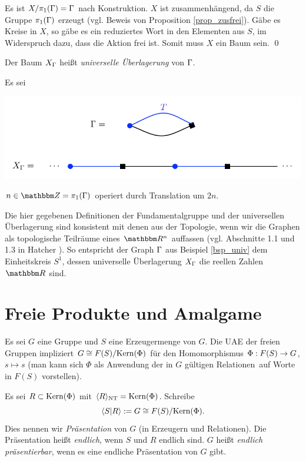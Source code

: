 \documentclass[a4paper, 12pt, twoside]{article}
\begin{document}
Es ist $X/\pi_1(\Gamma)=\Gamma$ nach Konstruktion. $X$ ist
zusammenhängend, da $S$ die Gruppe $\pi_1(\Gamma)$ erzeugt
(vgl. Beweis von Proposition \ref{prop_zusfrei}).
Gäbe es Kreise in $X$, so gäbe es ein reduziertes Wort in den
Elementen aus $S$, im Widerspruch dazu, dass die Aktion frei ist.
Somit muss $X$ ein Baum sein.
\qed

\DEF Der Baum $X_{\Gamma}$ heißt \emph{universelle Überlagerung} von $\Gamma$.

\BSP\label{bsp_univ} Es sei
\begin{center}
	\includegraphics{grugraImages/univ}
\end{center}
$n\in\ZZ=\pi_1(\GR)$ operiert durch Translation um $2n$.

Die hier gegebenen Definitionen der Fundamentalgruppe und der
universellen Überlagerung sind konsistent mit denen aus der
Topologie, wenn wir die Graphen als topologische Teilräume
eines $\RR^n$ auffassen
(vgl. Abschnitte 1.1 und 1.3 in Hatcher \cite{hatcher}).
So entspricht der Graph $\Gamma$ aus
Beispiel \ref{bsp_univ} dem Einheitskreis $S^1$, dessen
universelle Überlagerung $X_{\Gamma}$ die reellen Zahlen $\RR$ sind.


\section{Freie Produkte und Amalgame}\label{sec_amal}

Es sei $G$ eine Gruppe und $S$ eine Erzeugermenge von $G$.
Die UAE der freien Gruppen impliziert
$G\cong F(S)/\mathrm{Kern}(\Phi)$ für den Homomorphismus
$\Phi:F(S)\rightarrow G$, $s\mapsto s$ (man kann sich $\Phi$ als
\glqq Anwendung der in $G$ gültigen Relationen\grqq\ auf Worte
in $F(S)$ vorstellen).

\DEF Es sei $R\subset \mathrm{Kern}(\Phi)$ mit
$\langle R \rangle_{\mathrm{NT}} = \mathrm{Kern}(\Phi)$. Schreibe
\[
\langle S|R \rangle := G \cong F(S)/\mathrm{Kern}(\Phi).
\]
Dies nennen wir \emph{Präsentation} von $G$
(in Erzeugern und Relationen). Die Präsentation heißt
\emph{endlich},
wenn $S$ und $R$ endlich sind. $G$ heißt \emph{endlich präsentierbar},
wenn es eine endliche Präsentation von $G$ gibt.
\end{document}
